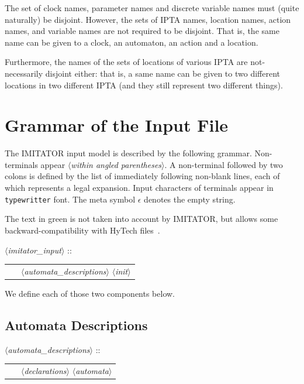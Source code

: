 \documentclass[a4paper,11pt]{report}
\newcommand{\emptystring}{$\epsilon$}
\newcommand{\hytech}{{\sc HyTech}}
\newcommand{\imitator}{\textsf{IMITATOR}}
\newcommand{\IPTA}{IPTA}
\newcommand{\nt}[1]{$\langle$\emph{#1}$\rangle$}
\newcommand{\regleGrammaire}[1]{\bigskip \noindent \nt{#1} :: \\}
\newcommand{\npec}[1]{\textcolor{green!50!black}{#1}}
\newcommand{\styleIMI}[1]{\textcolor{imicolor}{\texttt{#1}}}
\begin{document}
The set of clock names, parameter names and discrete variable names must (quite naturally) be disjoint.
However, the sets of \IPTA{} names, location names, action names, and variable names are not required to be disjoint.
That is, the same name can be given to a clock, an automaton, an action and a location.

Furthermore, the names of the sets of locations of various \IPTA{} are not-necessarily disjoint either: that is, a same name can be given to two different locations in two different \IPTA{} (and they still represent two different things).


\section{Grammar of the Input File}

The \imitator{} input model is described by the following grammar.
Non-terminals appear \nt{within angled parentheses}.
A non-terminal followed by two colons is defined by the list of immediately following non-blank lines, each of which represents a legal expansion.
Input characters of terminals appear in \styleIMI{typewritter} font.
The meta symbol \emptystring{} denotes the empty string.

The text \npec{in green} is not taken into account by \imitator{}, but allows some backward-compatibility with \hytech{} files~\cite{HHW95}.


\regleGrammaire{imitator\_input}
\begin{tabular}{l l}
	\  & \nt{automata\_descriptions} \nt{init} \\
\end{tabular}

\medskip


We define each of those two components below.

\subsection{Automata Descriptions}

\regleGrammaire{automata\_descriptions}
\begin{tabular}{l l}
	\  & \nt{declarations} \nt{automata} \\
\end{tabular}
\end{document}
